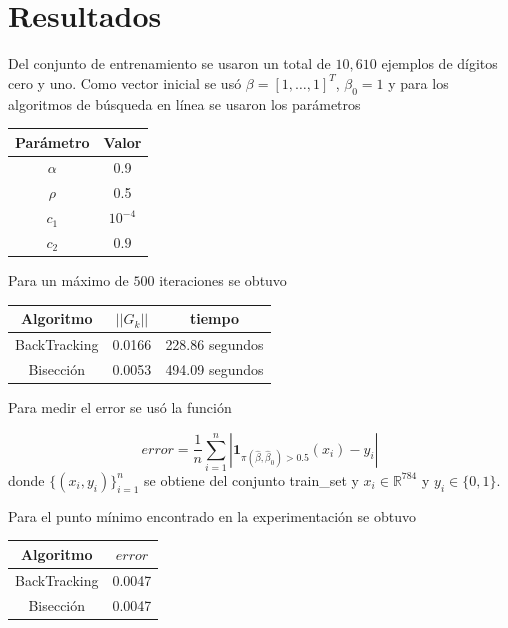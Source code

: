\documentclass[11pt,letterpaper]{article}
\theoremstyle{definition}
\theoremstyle{definition}
\theoremstyle{definition}
\begin{document}
\section{Resultados}
Del conjunto de entrenamiento se usaron un total de $ 10,610 $ ejemplos de dígitos cero y uno. Como vector inicial se usó $ \beta = [1, \dots, 1]^T $, $ \beta_0 = 1 $ y para los algoritmos de búsqueda en línea se usaron los parámetros
\begin{center}
	\begin{tabular}{cc}
		\hline
		Parámetro & Valor \\
		\hline
		$\alpha $ & 0.9 \\
		$ \rho $  & 0.5 \\
		$ c_1 $ & $ 10^{-4} $ \\
		$ c_2 $  & $ 0.9 $ \\
		\hline
	\end{tabular}
\end{center}
Para un máximo de $ 500 $ iteraciones se obtuvo
\begin{center}
	\begin{tabular}{ccc}
		\hline
		Algoritmo & $ || G_k || $ & tiempo \\
		\hline
		BackTracking & 0.0166 & 228.86 segundos \\
		Bisección    & 0.0053 & 494.09 segundos \\
		\hline
	\end{tabular}
\end{center}
\newpage
Para medir el error se usó la función
\begin{shaded*}
$$ error = \dfrac{1}{n} \sum_{i=1}^n | \textbf{1} _{\pi(\hat{\beta}, \hat{\beta}_0) > 0.5 }(x_i) - y_i | $$
donde $ \{ (x_i, y_i) \}_{i = 1} ^n  $ se obtiene del conjunto train\_set y $ x_i \in \mathbb{R}^{784} $ y $ y_i \in \{ 0, 1\} $.
\end{shaded*}
Para el punto mínimo encontrado en la experimentación se obtuvo
\begin{center}
	\begin{tabular}{cc}
		\hline
		Algoritmo    & $ error $  \\
		\hline
		BackTracking & 0.0047  \\
		Bisección    & 0.0047  \\
		\hline
	\end{tabular}
\end{center}
\end{document}
